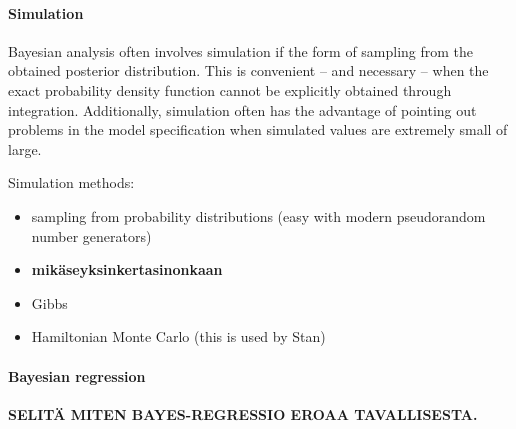 \paragraph{Simulation}\label{simulation}

Bayesian analysis often involves simulation if the form of sampling from the
obtained posterior distribution. This is convenient -- and necessary -- when
the exact probability density function cannot be explicitly obtained through
integration. Additionally, simulation often has the advantage of pointing out
problems in the model specification when simulated values are extremely small
of large.

Simulation methods:
\begin{itemize}
  \item
  sampling from probability distributions (easy with modern pseudorandom
  number generators)
  \item
  \textbf{mikäseyksinkertasinonkaan}
  \item
  Gibbs
  \item
  Hamiltonian Monte Carlo (this is used by Stan)
\end{itemize}


\paragraph{Bayesian regression}\label{bayesian-regression}

\textbf{SELITÄ MITEN BAYES-REGRESSIO EROAA TAVALLISESTA.}
